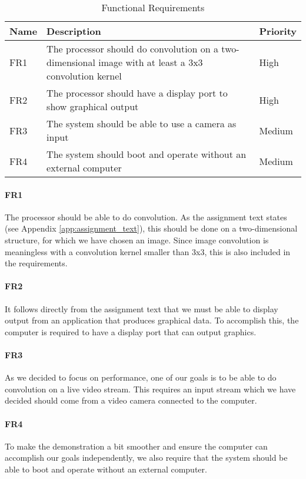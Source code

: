 \begin{table}[h]
    \centering
    \begin{tabular}{lp{12cm}l}
        Name & Description & Priority \\
        \hline
        FR1 &
            The processor should do convolution on a two-dimensional image with at least a 3x3 convolution kernel &
            High \\
        FR2 &
            The processor should have a display port to show graphical output &
            High \\
        FR3 &
            The system should be able to use a camera as input &
            Medium \\
        FR4 &
            The system should boot and operate without an external computer &
            Medium
    \end{tabular}
    \caption{Functional Requirements}
    \label{tab:FunctionalRequirements}
\end{table}

\paragraph{FR1}
The processor should be able to do convolution.
As the assignment text states (see Appendix \ref{app:assignment_text}), this should be done on a two-dimensional structure, for which we have chosen an image.
Since image convolution is meaningless with a convolution kernel smaller than 3x3,
this is also included in the requirements.

\paragraph{FR2}
It follows directly from the assignment text that we must be able to display output from an application that produces graphical data.
To accomplish this, the computer is required to have a display port that can output graphics.

\paragraph{FR3}
As we decided to focus on performance, one of our goals is to be able to do convolution on a live video stream.
This requires an input stream which we have decided should come from a video camera connected to the computer.

\paragraph{FR4}
To make the demonstration a bit smoother and ensure the computer can accomplish our goals independently, we also require that the system should be able to boot and operate without an external computer.

